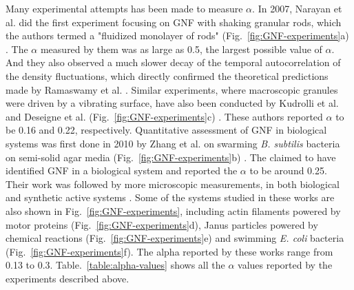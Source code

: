 Many experimental attempts has been made to measure $\alpha$. In 2007, Narayan et al. did the first experiment focusing on GNF with shaking granular rods, which the authors termed a "fluidized monolayer of rods" (Fig.~\ref{fig:GNF-experiments}a) \cite{Narayan2007}. The $\alpha$ measured by them was as large as 0.5, the largest possible value of $\alpha$. And they also observed a much slower decay of the temporal autocorrelation of the density fluctuations, which directly confirmed the theoretical predictions made by Ramaswamy et al. \cite{Ramaswamy2003}. Similar experiments, where macroscopic granules were driven by a vibrating surface, have also been conducted by Kudrolli et al. \cite{Kudrolli2008} and Deseigne et al. (Fig.~\ref{fig:GNF-experiments}c) \cite{Deseigne2010}. These authors reported $\alpha$ to be 0.16 and 0.22, respectively. Quantitative assessment of GNF in biological systems was first done in 2010 by Zhang et al. on swarming \textit{B. subtilis} bacteria on semi-solid agar media (Fig.~\ref{fig:GNF-experiments}b)  \cite{Zhang2010}.
The claimed to have identified GNF in a biological system and reported the $\alpha$ to be around 0.25. Their work was followed by more microscopic measurements, in both biological and synthetic active systems \cite{Schaller2013, Palacci2013, Kawaguchi2017, Nishiguchi2017, Karani2019}. Some of the systems studied in these works are also shown in Fig.~\ref{fig:GNF-experiments}, including actin filaments powered by motor proteins (Fig.~\ref{fig:GNF-experiments}d), Janus particles powered by chemical reactions (Fig.~\ref{fig:GNF-experiments}e) and swimming \textit{E. coli} bacteria (Fig.~\ref{fig:GNF-experiments}f). The alpha reported by these works range from 0.13 to 0.3.
Table.~\ref{table:alpha-values} shows all the $\alpha$ values reported by the experiments described above.

